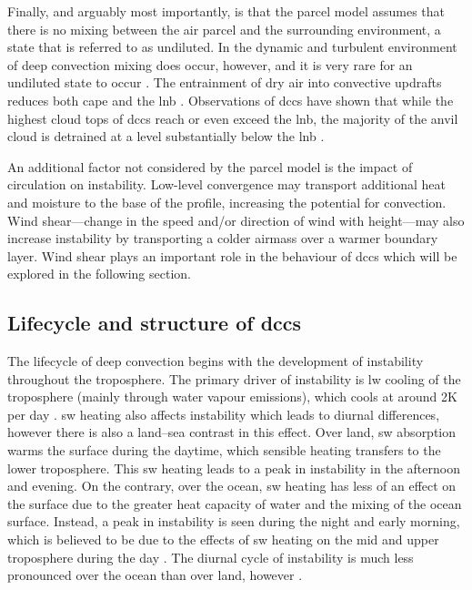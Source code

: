 Finally, and arguably most importantly, is that the parcel model assumes that there is no mixing between the air parcel and the surrounding environment, a state that is referred to as undiluted. 
In the dynamic and turbulent environment of deep convection mixing does occur, however, and it is very rare for an undiluted state to occur \citep{romps_undiluted_2010}. 
The entrainment of dry air into convective updrafts reduces both \acrshort{cape} \citep{zhang_effects_2009} and the \acrshort{lnb} \citep{masunaga_convective_2016}. 
Observations of \acrshort{dcc}s have shown that while the highest cloud tops of \acrshort{dcc}s reach or even exceed the \acrshort{lnb}, the majority of the anvil cloud is detrained at a level substantially below the \acrshort{lnb} \citep{takahashi_where_2012, takahashi_level_2017}.

An additional factor not considered by the parcel model is the impact of circulation on instability.
Low-level convergence may transport additional heat and moisture to the base of the profile, increasing the potential for convection.
Wind shear---change in the speed and/or direction of wind with height---may also increase instability by transporting a colder airmass over a warmer boundary layer.
Wind shear plays an important role in the behaviour of \acrshort{dcc}s which will be explored in the following section.

\subsection{Lifecycle and structure of \acrshort{dcc}s}

The lifecycle of deep convection begins with the development of instability throughout the troposphere. 
The primary driver of instability is \acrshort{lw} cooling of the troposphere (mainly through water vapour emissions), which cools at around 2K per day \citep{jeevanjee_simple_2020}. 
\acrshort{sw} heating also affects instability which leads to diurnal differences, however there is also a land--sea contrast in this effect. 
Over land, \acrshort{sw} absorption warms the surface during the daytime, which sensible heating transfers to the lower troposphere. 
This \acrshort{sw} heating leads to a peak in instability in the afternoon and evening. On the contrary, over the ocean, \acrshort{sw} heating has less of an effect on the surface due to the greater heat capacity of water and the mixing of the ocean surface. 
Instead, a peak in instability is seen during the night and early morning, which is believed to be due to the effects of \acrshort{sw} heating on the mid and upper troposphere during the day \citep{wall_life_2018}. 
The diurnal cycle of instability is much less pronounced over the ocean than over land, however \citep{taylor_evaluating_2017}.

